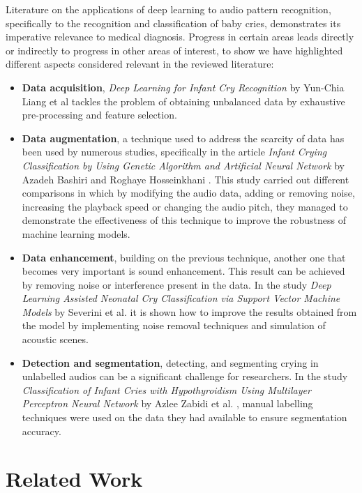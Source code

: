 Literature on the applications of deep learning to audio pattern recognition, specifically to the recognition and classification of baby cries, demonstrates its imperative relevance to medical diagnosis. Progress in certain areas leads directly or indirectly to progress in other areas of interest, to show we have highlighted different aspects considered relevant in the reviewed literature:
\begin{itemize}
    \item \textbf{Data acquisition}, \textit{Deep Learning for Infant Cry Recognition} by Yun-Chia Liang et al \cite{Liang2022} tackles the problem of obtaining unbalanced data by exhaustive pre-processing and feature selection.
    \item \textbf{Data augmentation}, a technique used to address the scarcity of data has been used by numerous studies, specifically in the article \textit{Infant Crying Classification by Using Genetic Algorithm and Artificial Neural Network} by Azadeh Bashiri and Roghaye Hosseinkhani \cite{Bashiri2020}. This study carried out different comparisons in which by modifying the audio data, adding or removing noise, increasing the playback speed or changing the audio pitch, they managed to demonstrate the effectiveness of this technique to improve the robustness of machine learning models. 
    \item \textbf{Data enhancement}, building on the previous technique, another one that becomes very important is sound enhancement. This result can be achieved by removing noise or interference present in the data. In the study \textit{Deep Learning Assisted Neonatal Cry Classification via Support Vector Machine Models} by Severini et al. \cite{K2021} it is shown how to improve the results obtained from the model by implementing noise removal techniques and simulation of acoustic scenes.
    \item \textbf{Detection and segmentation}, detecting, and segmenting crying in unlabelled audios can be a significant challenge for researchers. In the study \textit{Classification of Infant Cries with Hypothyroidism Using Multilayer Perceptron Neural Network} by Azlee Zabidi et al. \cite{zabidi2009classification}, manual labelling techniques were used on the data they had available to ensure segmentation accuracy.
\end{itemize}

\section{Related Work}

